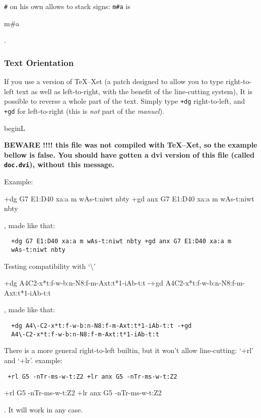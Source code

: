 \documentclass[final]{article}
\begin{document}
\verb/#/ on his own allows to stack signs: 
\verb/m#a/ is 
\begin{hieroglyph}
  m#a
\end{hieroglyph}.

\subsubsection{Text Orientation}

If you use a version of TeX--Xet (a patch designed to allow you to
type right-to-left text as well as left-to-right, with the benefit of
the line-cutting system), It is possible to reverse a whole part of
the text. Simply type \verb/+dg/ right-to-left, and \verb/+gd/ for
left-to-right (this is {\em not\/} part of the {\em manuel\/}).

\expandafter\ifx\csname beginL\endcsname\relax %
\def\beginL{\relax}             %
\def\beginR{\relax} \def\endR{\relax} \def\endL{\relax}

{\bf BEWARE !!!! this file was not compiled with TeX--Xet, so the
  example bellow is false. You should have gotten a dvi version of
  this file (called \verb/doc.dvi/), without this message.} \fi

Example:
\begin{hieroglyph}
  +dg G7 E1:D40 xa:a m wAs-t:niwt nbty +gd anx G7 E1:D40 xa:a m
  wAs-t:niwt nbty
\end{hieroglyph}, made like that: 
\begin{verbatim}
  +dg G7 E1:D40 xa:a m wAs-t:niwt nbty +gd anx G7 E1:D40 xa:a m
  wAs-t:niwt nbty
\end{verbatim}

Testing compatibility with `\textbackslash'
\begin{hieroglyph}
  +dg A4\-C2-x*t:f-w-b:n-N8:f-m-Axt:t*1-iAb-t:t -+gd
  A4\-C2-x*t:f-w-b:n-N8:f-m-Axt:t*1-iAb-t:t
\end{hieroglyph}, made like that: 
\begin{verbatim}
  +dg A4\-C2-x*t:f-w-b:n-N8:f-m-Axt:t*1-iAb-t:t -+gd
  A4\-C2-x*t:f-w-b:n-N8:f-m-Axt:t*1-iAb-t:t
\end{verbatim}

There is a more general right-to-left builtin, but it won't allow
line-cutting: `+rl' and `+lr'. 
example:
\begin{verbatim}
 +rl G5 -nTr-ms-w-t:Z2 +lr anx G5 -nTr-ms-w-t:Z2 
\end{verbatim}
\begin{hieroglyph}
   +rl G5 -nTr-ms-w-t:Z2 +lr anx G5 -nTr-ms-w-t:Z2 
\end{hieroglyph}. It will work in any case.
\end{document}
